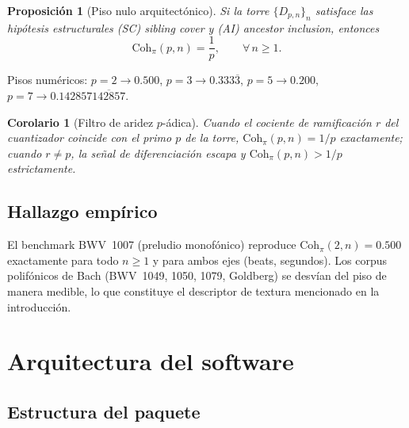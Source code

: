 \documentclass[11pt,a4paper,oneside]{article}
\theoremstyle{plain}
\newtheorem{proposition}[theorem]{Proposición}
\newtheorem{corollary}[theorem]{Corolario}
\theoremstyle{definition}
\theoremstyle{remark}
\newcommand{\Dn}{D_{p,n}}
\newcommand{\Cohpi}{\mathrm{Coh}_\pi}
\begin{document}
\begin{proposition}[Piso nulo arquitectónico]\label{prop:floor}
Si la torre $\{\Dn\}_n$ satisface las hipótesis estructurales
\textnormal{(SC)} \emph{sibling cover} y \textnormal{(AI)}
\emph{ancestor inclusion}, entonces
\[
  \Cohpi(p,n) = \frac{1}{p}, \qquad \forall\, n \geq 1.
\]
\end{proposition}

Pisos numéricos: $p=2 \to 0.500$, $p=3 \to 0.333\overline{3}$, $p=5 \to
0.200$, $p=7 \to 0.142857\overline{142857}$.

\begin{corollary}[Filtro de aridez $p$-ádica]\label{cor:aridity}
Cuando el cociente de ramificación $r$ del cuantizador coincide con el
primo $p$ de la torre, $\Cohpi(p,n) = 1/p$ exactamente; cuando
$r \neq p$, la señal de diferenciación escapa y $\Cohpi(p,n) > 1/p$
estrictamente.
\end{corollary}

\subsection{Hallazgo empírico} El benchmark BWV~1007 (preludio
monofónico) reproduce $\Cohpi(2,n) = 0.500$ exactamente para todo
$n \geq 1$ y para ambos ejes (beats, segundos). Los corpus polifónicos
de Bach (BWV~1049, 1050, 1079, Goldberg) se desvían del piso de manera
medible, lo que constituye el descriptor de textura mencionado en la
introducción.

\section{Arquitectura del software}\label{sec:arch}

\subsection{Estructura del paquete}
\end{document}
